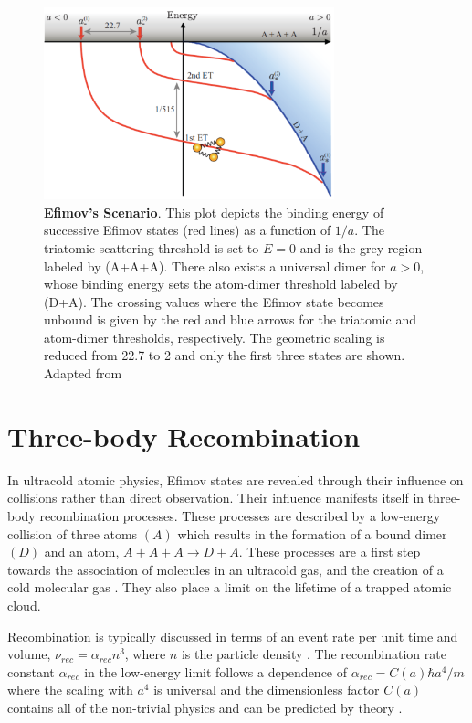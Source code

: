 \documentclass[prl,onecolumn,amsmath,amssymb,titlepage,nofootinbib,preprint]{revtex4-1}
\begin{document}
	\begin{figure}
		\includegraphics[width=0.75\textwidth]{Figures/efimov_phase_diagram}
		\caption{\textbf{Efimov's Scenario}.  This plot depicts the binding energy of successive Efimov states (red lines) as a function of $1/a$.  The triatomic scattering threshold is set to $E=0$ and is the grey region labeled by (A+A+A).  There also exists a universal dimer for $a>0$, whose binding energy sets the atom-dimer threshold labeled by (D+A).  The crossing values where the Efimov state becomes unbound is given by the red and blue arrows for the triatomic and atom-dimer thresholds, respectively.  The geometric scaling is reduced from 22.7 to 2 and only the first three states are shown. Adapted from \cite{Berninger2011}}
		\label{fig:efimov_scenario}
	\end{figure}

\section{Three-body Recombination}
In ultracold atomic physics, Efimov states are revealed through their influence on collisions rather than direct observation.  Their influence manifests itself in three-body recombination processes.  These processes are described by a low-energy collision of three atoms $(A)$ which results in the formation of a bound dimer $(D)$ and an atom, $A+A+A \rightarrow D+A$.  These processes are a first step towards the association of molecules in an ultracold gas, and the creation of a cold molecular gas \cite{Jochim2003}.  They also place a limit on the lifetime of a trapped atomic cloud.

Recombination is typically discussed in terms of an event rate per unit time and volume, $\nu_{rec}=\alpha_{rec}n^{3}$, where $n$ is the particle density \cite{Weber2003_recomb}. The recombination rate constant $\alpha_{rec}$ in the low-energy limit follows a dependence of $\alpha_{rec}=C(a)\hbar a^{4}/m$ where the scaling with $a^{4}$ is universal \cite{Fedichev1996} and the dimensionless factor $C(a)$ contains all of the non-trivial physics \cite{Esry1999}\cite{Nielsen1999} and can be predicted by theory \cite{Braaten_2006}.
\end{document}
